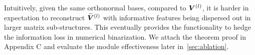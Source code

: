 \vspace{-0.05in}
Intuitively, given the same orthonormal bases, compared to {\footnotesize$\boldsymbol{V}^{(l)}$}, it is harder in expectation to reconstruct {\footnotesize$\widetilde{\boldsymbol{V}}^{(l)}$} with informative features being dispersed out in larger matrix sub-structures.
This eventually provides the functionality to hedge the information loss in numerical binarization. 
We attach the theorem proof in Appendix C and evaluate the module effectiveness later in~\cref{sec:ablation}.

